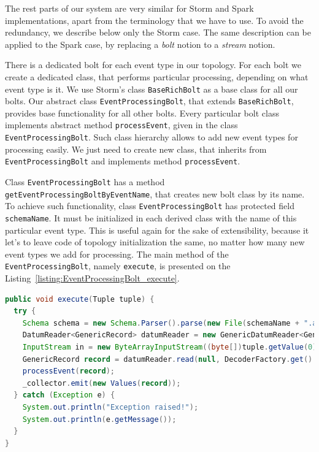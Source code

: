 The rest parts of our system are very similar for Storm and Spark implementations, apart from the terminology that we have to use.
To avoid the redundancy, we describe below only the Storm case.
The same description can be applied to the Spark case, by replacing a \textit{bolt} notion to a \textit{stream} notion. 

There is a dedicated bolt for each event type in our topology.
For each bolt we create a dedicated class, that performs particular processing, depending on what event type is it.
We use Storm's class \lstinline{BaseRichBolt} as a base class for all our bolts.
Our abstract class \lstinline{EventProcessingBolt}, that extends \lstinline{BaseRichBolt}, provides base functionality for all other bolts.
Every particular bolt class implements abstract method \lstinline{processEvent}, given in the class \lstinline{EventProcessingBolt}.
Such class hierarchy allows to add new event types for processing easily.
We just need to create new class, that inherits from \lstinline{EventProcessingBolt} and implements method \lstinline{processEvent}.

Class \lstinline{EventProcessingBolt} has a method \lstinline{getEventProcessingBoltByEventName}, that creates new bolt class by its name.
To achieve such functionality, class \lstinline{EventProcessingBolt} has protected field \lstinline{schemaName}.
It must be initialized in each derived class with the name of this particular event type.
This is useful again for the sake of extensibility, because it let's to leave code of topology initialization the same, no matter how many new event types we add for processing.
The main method of the \lstinline{EventProcessingBolt}, namely \lstinline{execute}, is presented on the Listing~\ref{listing:EventProcessingBolt_execute}.

\begin{lstlisting}[float=h, caption=The main method of the EventProcessingBolt., label=listing:EventProcessingBolt_execute, language=Java]
public void execute(Tuple tuple) {
  try {
    Schema schema = new Schema.Parser().parse(new File(schemaName + ".avsc"));
    DatumReader<GenericRecord> datumReader = new GenericDatumReader<GenericRecord>(schema);
    InputStream in = new ByteArrayInputStream((byte[])tuple.getValue(0));
    GenericRecord record = datumReader.read(null, DecoderFactory.get().jsonDecoder(schema, in));
    processEvent(record);
    _collector.emit(new Values(record));
  } catch (Exception e) {
    System.out.println("Exception raised!");
    System.out.println(e.getMessage());
  }
}
\end{lstlisting}

